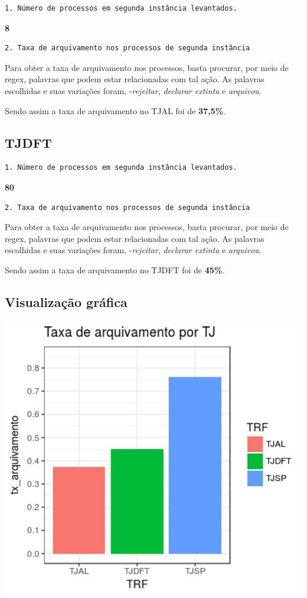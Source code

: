 \documentclass[12pt]{article}
\begin{document}
\begin{verbatim}
1. Número de processos em segunda instância levantados.
\end{verbatim}

\textbf{8}

\begin{verbatim}
2. Taxa de arquivamento nos processos de segunda instância
\end{verbatim}

Para obter a taxa de arquivamento nos processos, basta procurar, por
meio de regex, palavras que podem estar relacionadas com tal ação. As
palavras escolhidas e suas variações foram, -\emph{rejeitar},
\emph{declarar extinta} e \emph{arquivou}.

Sendo assim a taxa de arquivamento no TJAL foi de \textbf{37,5\%}.

\subsection{TJDFT}\label{tjdft}

\begin{verbatim}
1. Número de processos em segunda instância levantados.
\end{verbatim}

\textbf{80}

\begin{verbatim}
2. Taxa de arquivamento nos processos de segunda instância
\end{verbatim}

Para obter a taxa de arquivamento nos processos, basta procurar, por
meio de regex, palavras que podem estar relacionadas com tal ação. As
palavras escolhidas e suas variações foram, -\emph{rejeitar},
\emph{declarar extinta} e \emph{arquivou}.

Sendo assim a taxa de arquivamento no TJDFT foi de \textbf{45\%}.

\subsection{Visualização gráfica}\label{visualizacao-grafica-1}

\includegraphics[width=5.57in]{plot_tj}
\end{document}
